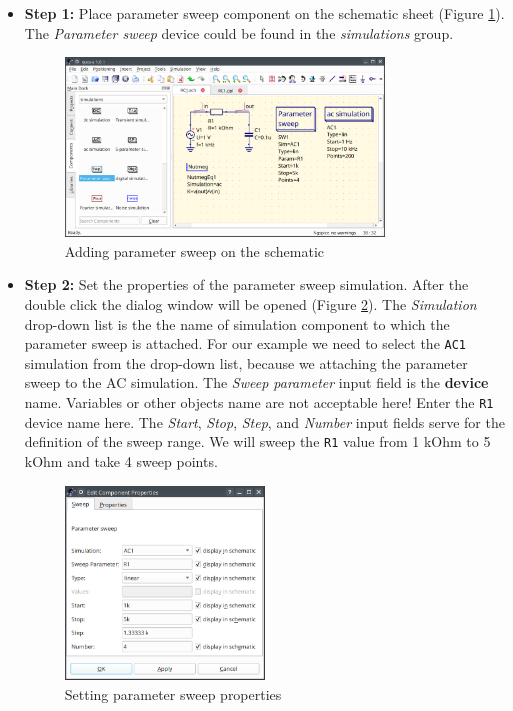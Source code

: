 \documentclass[a4paper,12pt]{article}
\begin{document}
\begin{itemize}
 \item \textbf{Step 1:} Place parameter sweep component on the schematic sheet (Figure \ref{fig:rc_parsw}). 
 The \emph{Parameter sweep} device could be found in the \emph{simulations} group. 
 
    \begin{figure}[!ht]
        \begin{center}
            \includegraphics[width=0.8\textwidth]{img/rc_parsw.png}
        \end{center}
        \caption{Adding parameter sweep on the schematic} 
    \label{fig:rc_parsw}
    \end{figure}

\item \textbf{Step 2:} Set the properties of the parameter sweep simulation. After the double click the dialog window will be 
opened (Figure \ref{fig:parsw}). The \emph{Simulation} drop-down list is the the name of simulation component to which the parameter sweep is attached. For our example we need to select the \verb|AC1| simulation from the drop-down list, because we attaching the parameter sweep to the AC simulation. The \emph{Sweep parameter} input field is the \textbf{device} name. Variables or other objects 
name are not acceptable here! Enter the \verb|R1| device name here. The \emph{Start}, \emph{Stop}, \emph{Step}, and \emph{Number} input fields serve for the definition of the sweep range. We will sweep the \verb|R1| value from 1 kOhm to 5 kOhm and take 4 sweep points. 

    \begin{figure}[!ht]
        \begin{center}
            \includegraphics[width=0.5\textwidth]{img/parsw_dlg.png}
        \end{center}
        \caption{Setting parameter sweep properties} 
    \label{fig:parsw}
    \end{figure}
    

\end{itemize}
\end{document}
